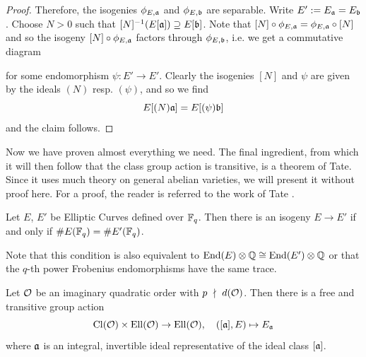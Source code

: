 \begin{proof}
    Therefore, the isogenies $\phi_{E, \mathfrak{a}}$ and $\phi_{E, \mathfrak{b}}$ are separable.
    Write $E' := E_{\mathfrak{a}} = E_{\mathfrak{b}}$.
    Choose $N > 0$ such that $[N]^{-1}(E[\mathfrak{a}]) \supseteq E[\mathfrak{b}]$.
    Note that $[N] \circ \phi_{E, \mathfrak{a}} = \phi_{E, \mathfrak{a}} \circ [N]$ and so the isogeny $[N] \circ \phi_{E, \mathfrak{a}}$ factors through $\phi_{E, \mathfrak{b}}$, i.e. we get a commutative diagram
    \begin{center}
    \end{center}
    for some endomorphism $\psi: E' \to E'$.
    Clearly the isogenies $[N]$ and $\psi$ are given by the ideals $(N)$ resp. $(\psi)$, and so we find
    \begin{equation*}
        E[(N)\mathfrak{a}] = E[(\psi)\mathfrak{b}]
    \end{equation*}
    and the claim follows.
\end{proof}
Now we have proven almost everything we need.
The final ingredient, from which it will then follow that the class group action is transitive, is a theorem of Tate.
Since it uses much theory on general abelian varieties, we will present it without proof here.
For a proof, the reader is referred to the work of Tate \cite{tate}.
\begin{theorem}
    \label{prop:isogeny_theorem}
    Let $E$, $E'$ be Elliptic Curves defined over $\mathbb{F}_q$.
    Then there is an isogeny $E \to E'$ if and only if $\#E(\mathbb{F}_q) = \#E'(\mathbb{F}_q)$.
\end{theorem}
Note that this condition is also equivalent to $\mathrm{End}(E) \otimes \mathbb{Q} \cong \mathrm{End}(E') \otimes \mathbb{Q}$ or that the $q$-th power Frobenius endomorphisms have the same trace. 
\begin{theorem}
    \label{prop:class_group_action}
    Let $\mathcal{O}$ be an imaginary quadratic order with $p \ \nmid \  d(\mathcal{O})$.
    Then there is a free and transitive group action
    \begin{equation*}
        \mathrm{Cl}(\mathcal{O}) \times \mathrm{Ell}(\mathcal{O}) \to \mathrm{Ell}(\mathcal{O}), \quad ([\mathfrak{a}], E) \mapsto E_{\mathfrak{a}}
    \end{equation*}
    where $\mathfrak{a}$ is an integral, invertible ideal representative of the ideal class $[\mathfrak{a}]$.
\end{theorem}
